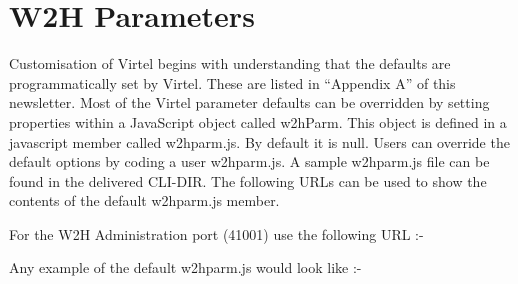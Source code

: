 \documentclass[letterpaper,10pt,english]{sphinxmanual}
\begin{document}
\section{W2H Parameters}
\label{\detokenize{TN202002:w2h-parameters}}
Customisation of Virtel begins with understanding that the defaults are programmatically set by Virtel. These are listed in “Appendix A” of this newsletter. Most of the Virtel parameter defaults can be overridden by setting properties within a JavaScript object called w2hParm. This object is defined in a javascript member called w2hparm.js. By default it is null. Users can override the default options by coding a user w2hparm.js. A sample w2hparm.js file can be found in the delivered CLI-DIR. The following URLs can be used to show the contents of the default w2hparm.js member.

For the W2H Administration port (41001) use the following URL  :-

\begin{sphinxVerbatim}[commandchars=\\\{\}]
\end{sphinxVerbatim}

Any example of the default w2hparm.js would look like :-
\end{document}
